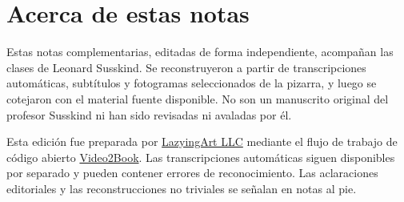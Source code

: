 \documentclass[11pt,oneside]{book}
\begin{document}
\frontmatter
\hypersetup{pageanchor=false}

\hypersetup{pageanchor=true}

\clearpage
\chapter{Acerca de estas notas}
Estas notas complementarias, editadas de forma independiente, acompañan las clases de Leonard Susskind. Se reconstruyeron a partir de transcripciones automáticas, subtítulos y fotogramas seleccionados de la pizarra, y luego se cotejaron con el material fuente disponible. No son un manuscrito original del profesor Susskind ni han sido revisadas ni avaladas por él.

Esta edición fue preparada por \href{https://lazying.art}{LazyingArt LLC} mediante el flujo de trabajo de código abierto \href{https://github.com/lachlanchen/Video2Book}{Video2Book}. Las transcripciones automáticas siguen disponibles por separado y pueden contener errores de reconocimiento. Las aclaraciones editoriales y las reconstrucciones no triviales se señalan en notas al pie.
\clearpage
\tableofcontents
\mainmatter










\end{document}
